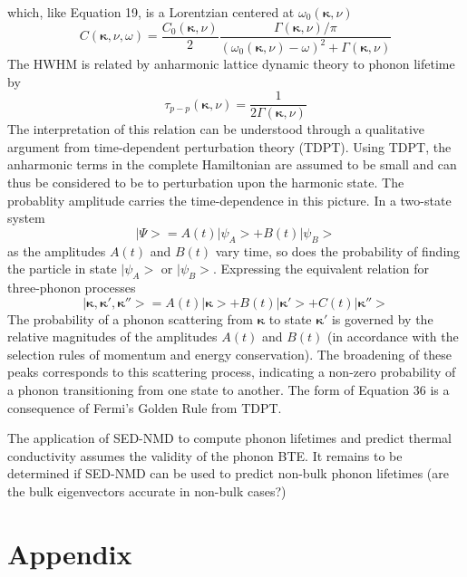 \documentclass[aps,prb,preprint,preprintnumbers,amsmath,amssymb,floatfix,superscriptaddress]{revtex4}
\begin{document}
which, like Equation 19, is a Lorentzian centered at $\omega_0(\pmb{\kappa},\nu)$
\begin{equation}
C(\pmb{\kappa},\nu,\omega)=\frac{C_0(\pmb{\kappa},\nu)}{2}\frac{\Gamma(\pmb{\kappa},\nu)/\pi}{(\omega_0(\pmb{\kappa},\nu)-\omega)^2+\Gamma(\pmb{\kappa},\nu)}
\end{equation}
The HWHM is related by anharmonic lattice dynamic theory \cite{PhysRev.128.2589} to phonon lifetime by
\begin{equation}
\tau_{p-p}(\pmb{\kappa}, \nu)=\frac{1}{2\Gamma(\pmb{\kappa},\nu)}
\end{equation}
The interpretation of this relation can be understood through a qualitative argument from time-dependent perturbation theory (TDPT). Using TDPT, the anharmonic terms in the complete Hamiltonian are assumed to be small and can thus be considered to be to perturbation upon the harmonic state. The probablity amplitude carries the time-dependence in this picture. In a two-state system
\begin{equation}
|\Psi>=A(t)|\psi_A>+B(t)|\psi_B>
\end{equation}
as the amplitudes $A(t)$ and $B(t)$ vary time, so does the probability of finding the particle in state $|\psi_A>$ or $|\psi_B>$. Expressing the equivalent relation for three-phonon processes
\begin{equation}
|\pmb{\kappa},\pmb{\kappa}',\pmb{\kappa}''>=A(t)|\pmb{\kappa}>+B(t)|\pmb{\kappa}'>+C(t)|\pmb{\kappa}''>
\end{equation}
The probability of a phonon scattering from $\pmb{\kappa}$ to state $\pmb{\kappa}'$ is governed by the relative magnitudes of the amplitudes $A(t)$ and $B(t)$ (in accordance with the selection rules of momentum and energy conservation). The broadening of these peaks corresponds to this scattering process, indicating a non-zero probability of a phonon transitioning from one state to another. The form of Equation 36 is a consequence of Fermi's Golden Rule from TDPT.

The application of SED-NMD to compute phonon lifetimes and predict thermal conductivity assumes the validity of the phonon BTE. It remains to be determined if SED-NMD can be used to predict non-bulk phonon lifetimes (are the bulk eigenvectors accurate in non-bulk cases?) 
\newpage

\section*{Appendix}
\end{document}

